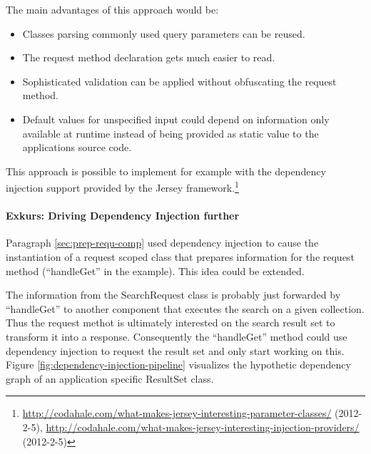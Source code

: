 \documentclass[12pt,a4paper]{scrartcl}		%
\newcommand{\citeurl}[2]{\url{#1} (#2)}
\begin{document}
The main advantages of this approach would be:

\begin{itemize}
\item Classes parsing commonly used query parameters can be reused.
\item The request method declaration gets much easier to read.
\item Sophisticated validation can be applied without obfuscating the request method.
\item Default values for unspecified input could depend on information only
  available at runtime instead of being provided as static value to the
  applications source code.
\end{itemize}

This approach is possible to implement for example with the dependency injection
support provided by the Jersey
framework.\footnote{\citeurl{http://codahale.com/what-makes-jersey-interesting-parameter-classes/}{2012-2-5},
  \citeurl{http://codahale.com/what-makes-jersey-interesting-injection-providers/}{2012-2-5}}

\paragraph{Exkurs: Driving Dependency Injection further}
Paragraph \ref{sec:prep-requ-comp} used dependency injection to cause the
instantiation of a request scoped class that prepares information for the
request method (``handleGet'' in the example). This idea could be extended.

The information from the SearchRequest class is probably just forwarded by
``handleGet'' to another component that executes the search on a given
collection. Thus the request methot is ultimately interested on the search
result set to transform it into a response. Consequently the ``handleGet''
method could use dependency injection to request the result set and only start
working on this. Figure \ref{fig:dependency-injection-pipeline} visualizes the
hypothetic dependency graph of an application specific ResultSet class.
\end{document}
